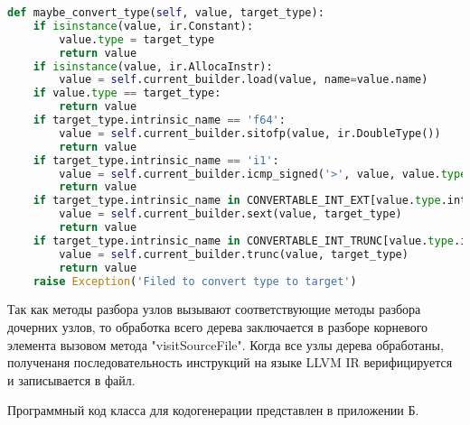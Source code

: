 \begin{lstlisting}[language=Python,caption={Вспомогательный метод согласования типов},label={lst:helpers}]
def maybe_convert_type(self, value, target_type):
    if isinstance(value, ir.Constant):
        value.type = target_type
        return value
    if isinstance(value, ir.AllocaInstr):
        value = self.current_builder.load(value, name=value.name)
    if value.type == target_type:
        return value
    if target_type.intrinsic_name == 'f64':
        value = self.current_builder.sitofp(value, ir.DoubleType())
        return value
    if target_type.intrinsic_name == 'i1':
        value = self.current_builder.icmp_signed('>', value, value.type(0))
        return value
    if target_type.intrinsic_name in CONVERTABLE_INT_EXT[value.type.intrinsic_name]:
        value = self.current_builder.sext(value, target_type)
        return value
    if target_type.intrinsic_name in CONVERTABLE_INT_TRUNC[value.type.intrinsic_name]:
        value = self.current_builder.trunc(value, target_type)
        return value
    raise Exception('Filed to convert type to target')
\end{lstlisting}

Так как методы разбора узлов вызывают соответствующие методы разбора дочерних узлов, то обработка всего дерева
заключается в разборе корневого элемента вызовом метода "visitSourceFile".
Когда все узлы дерева обработаны, полученаня последовательность инструкций на языке LLVM IR верифицируется и записывается
в файл.

Программный код класса для кодогенерации представлен в приложении Б.